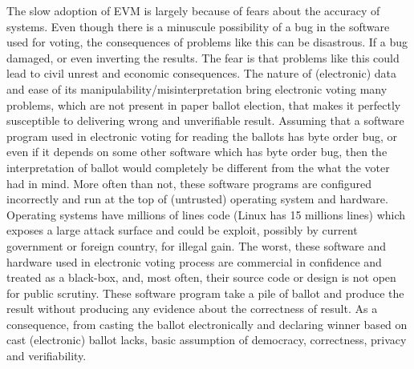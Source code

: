 The slow adoption of EVM is largely because of fears about the accuracy of systems. Even though there is a minuscule possibility of a bug in 
the software used for voting, the consequences of problems like this can be disastrous. If a bug damaged, or even inverting the results. 
The fear is that problems like this could lead to civil unrest and economic consequences.  The nature of (electronic) data and ease of 
its manipulability/misinterpretation bring electronic voting many problems, which are not present in paper ballot election, that 
makes it perfectly susceptible to delivering wrong and unverifiable result. Assuming that a software program used in electronic voting 
for reading the ballots has byte order bug, or even if it depends on some other software which has byte order bug, then the interpretation of 
ballot would completely be different from the what the voter had in mind. More often than not, these software programs are 
configured incorrectly and run at the top of (untrusted) operating system and hardware. Operating systems have millions of 
lines code (Linux has 15 millions lines) which exposes a large attack surface and could be exploit, possibly by current government 
or foreign country, for illegal gain. The worst, these software and hardware used in electronic voting process are commercial in 
confidence and treated as a black-box, and, most often, their source code or design is not open for public scrutiny. These software program 
take a pile of ballot and produce the result without producing any evidence about the correctness of result.  As a consequence,
from casting the ballot electronically and declaring winner based on cast (electronic) ballot lacks, basic assumption 
of democracy, correctness, privacy and verifiability. 
































